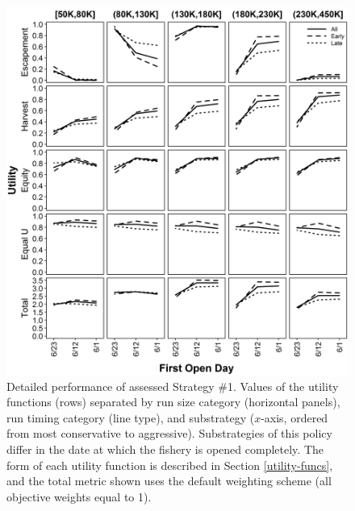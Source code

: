 \documentclass[12pt,]{book}
\theoremstyle{definition}
\theoremstyle{definition}
\theoremstyle{definition}
\theoremstyle{remark}
\begin{document}
\begin{singlespace}
\clearpage
\begin{figure}
  \centering
  \includegraphics{img/Ch3/Values_1.jpg}
  \caption{Detailed performance of assessed Strategy \#1. Values of the utility functions (rows) separated by run size category (horizontal panels), run timing category (line type), and substrategy ($x$-axis, ordered from most conservative to aggressive). Substrategies of this policy differ in the date at which the fishery is opened completely. The form of each utility function is described in Section \ref{utility-funcs}, and the total metric shown uses the default weighting scheme (all objective weights equal to 1).}
  \label{fig:ms1-utilities}
\end{figure}


\end{singlespace}
\end{document}
